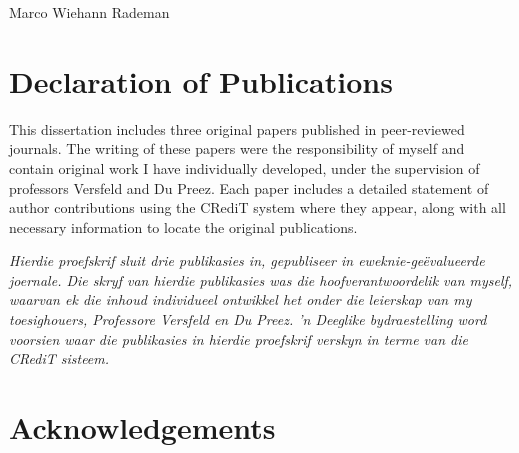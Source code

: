 \documentclass[11pt,oneside,openany,a4paper, %
afrikaans,UKenglish, %
PhD, a5block %
]{stb-thesis}
\begin{document}
\title{}
\author{M.W. Rademan}{Marco Wiehann Rademan}
\SetCopyrightOff
\address{}


\begin{singlespace}
\TitlePage%
\end{singlespace}


\begin{singlespace}
\DeclarationDate{\today}
\DeclarationPage
\end{singlespace}


\chapter*{Declaration of Publications}

This dissertation includes three original papers published in peer-reviewed journals. The writing of these papers were the responsibility of myself and contain original work I have individually developed, under the supervision of professors Versfeld and Du Preez. Each paper includes a detailed statement of author contributions using the CRediT system where they appear, along with all necessary information to locate the original publications.

\textit{Hierdie proefskrif sluit drie publikasies in, gepubliseer in eweknie-geëvalueerde joernale. Die skryf van hierdie publikasies was die hoofverantwoordelik van myself, waarvan ek die inhoud individueel ontwikkel het onder die leierskap van my toesighouers, Professore Versfeld en Du Preez. 'n Deeglike bydraestelling word voorsien waar die publikasies in hierdie proefskrif verskyn in terme van die CRediT sisteem.}

\chapter*{Acknowledgements}
\end{document}

